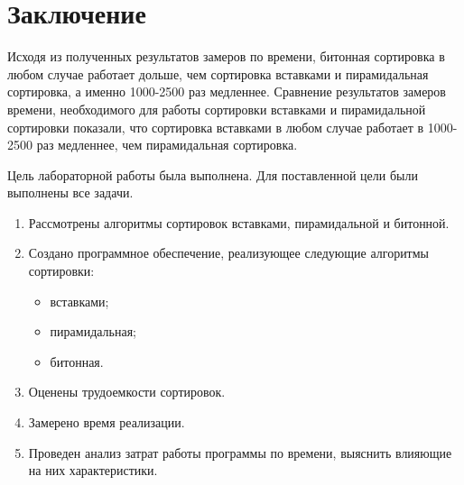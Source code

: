 \chapter*{Заключение}

Исходя из полученных результатов замеров по времени, битонная сортировка в любом случае работает дольше, чем сортировка вставками и пирамидальная сортировка, а именно 1000-2500 раз медленнее.
Сравнение результатов замеров времени, необходимого для работы сортировки вставками и пирамидальной сортировки показали, что сортировка вставками в любом случае работает в 1000-2500 раз медленнее, чем пирамидальная сортировка.

Цель лабораторной работы была выполнена.
Для поставленной цели были выполнены все задачи.
\begin{enumerate}[label={\arabic*)}]
	\item Рассмотрены алгоритмы сортировок вставками, пирамидальной и битонной.
	\item Создано программное обеспечение, реализующее следующие алгоритмы сортировки:
	\begin{itemize}[label=---]
		\item вставками;
		\item пирамидальная;
		\item битонная.
	\end{itemize}
	\item Оценены трудоемкости сортировок.
	\item Замерено время реализации.
	\item Проведен анализ затрат работы программы по времени, выяснить влияющие на них характеристики.
\end{enumerate}
